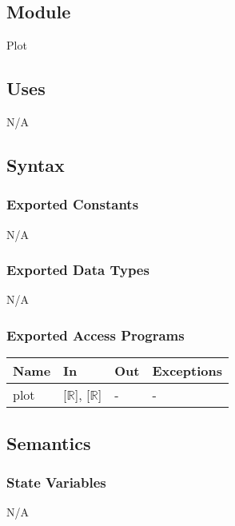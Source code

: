 \documentclass[12pt, titlepage]{article}
\begin{document}
\subsection{Module}
Plot

\subsection{Uses}

N/A

\subsection{Syntax}

\subsubsection{Exported Constants}
N/A

\subsubsection{Exported Data Types}

N/A

\subsubsection{Exported Access Programs}

\begin{center}
	\renewcommand*{\arraystretch}{1.5}
	\begin{tabular} {p{}  p{}  p{} 
			p{} } \hline 
		\textbf{Name} & \textbf{In} & \textbf{Out} & \textbf{Exceptions} \\ 
		\hline
		
		plot & [$\mathbb{R}$], [$\mathbb{R}$] & - & - \\ \hline
	\end{tabular}
\end{center}

\subsection{Semantics}

\subsubsection{State Variables}

N/A
\end{document}
